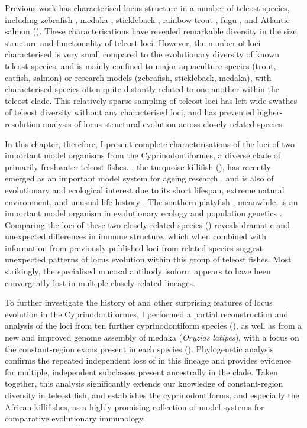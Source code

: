 Previous work has characterised \igh{} locus structure in a number of teleost species, including zebrafish \parencite{danilova2005zebrafish}, medaka \parencite{magadan2011medaka}, stickleback \parencite{bao2010stickleback,gambondeza2011stickleback}, rainbow trout \parencite{hansen2005trout}, fugu \parencite{savan2005fugu}, and Atlantic salmon \parencite{yasuike2010salmon} (). These characterisations have revealed remarkable diversity in the size, structure and functionality of teleost \igh{} loci. However, the number of loci characterised is very small compared to the evolutionary diversity of known teleost species, and is mainly confined to major aquaculture species (trout, catfish, salmon) or research models (zebrafish, stickleback, medaka), with characterised species often quite distantly related to one another within the teleost clade. This relatively sparse sampling of teleost \igh{} loci has left wide swathes of teleost diversity without any characterised \igh{} loci, and has prevented higher-resolution analysis of locus structural evolution across closely related species.

In this chapter, therefore, I present complete characterisations of the \igh{} loci of two important model organisms from the Cyprinodontiformes, a diverse clade of primarily freshwater teleost fishes. \nfu, the turquoise killifish (), has recently emerged as an important model system for ageing research \parencite{harel2015platform,valenzano2015genome}, and is also of evolutionary and ecological interest due to its short lifespan, extreme natural environment, and unusual life history \parencite{cellerino2016bush}. The southern platyfish \xma, meanwhile, is an important model organism in evolutionary ecology and population genetics \parencite{schartl2013platyfish}. Comparing the \igh{} loci of these two closely-related species () reveals dramatic and unexpected differences in immune structure, which when combined with information from previously-published loci from related species suggest unexpected patterns of locus evolution within this group of teleost fishes. Most strikingly, the specialised mucosal antibody isoform  appears to have been convergently lost in multiple closely-related lineages. 

To further investigate the history of  and other surprising features of \igh{} locus evolution in the Cyprinodontiformes, I performed a partial reconstruction and analysis of the \igh{} loci from ten further cyprinodontiform species (), as well as from a new and improved genome assembly of medaka (\textit{Oryzias latipes}), with a focus on the constant-region exons present in each species (). Phylogenetic analysis confirms the repeated independent loss of  in this lineage and provides evidence for multiple, independent  subclasses present ancestrally in the clade. Taken together, this analysis significantly extends our knowledge of constant-region diversity in teleost fish, and establishes the cyprinodontiforms, and especially the African killifishes, as a highly promising collection of model systems for comparative evolutionary immunology.

